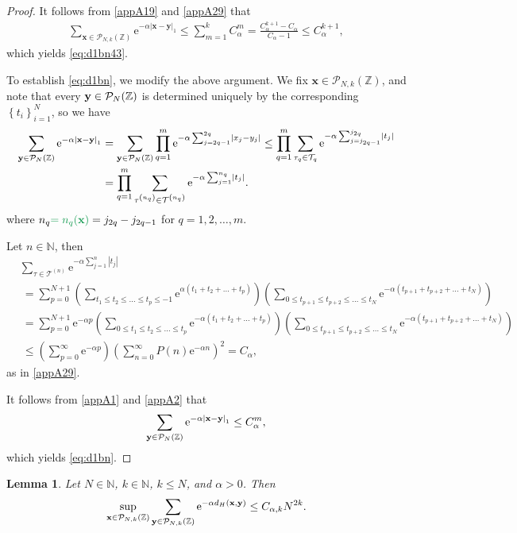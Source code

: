 \documentclass[12pt, a4paper,reqno]{amsart}
\newcommand{\fg}{\color{ForestGreen}}
\numberwithin{equation}{section}
\newtheorem{lemma}[theorem]{Lemma}
\newcommand\N{\mathbb N}
\newcommand\Z{\mathbb Z}
\newcommand\cT{\mathcal{T}}
\newcommand\x{\mathbf{x}}
\newcommand\y{\mathbf{y}}
\newcommand\e{\mathrm{e}}
\newcommand\cP{\mathcal{P}}
\newcommand\be{\begin{equation}\begin{aligned}}
\newcommand\ee{\end{aligned}\end{equation}}
\newcommand{\abs}[1]{\left\lvert #1 \right\rvert}
\newcommand{\set}[1]{\left\{ #1 \right\}}
\newcommand{\pa}[1]{\left( #1 \right)}
\newcommand{\eq}[1]{\eqref{#1}}
\newcommand{\up}[1]{^{\left(#1\right)}}
\begin{document}
\begin{proof}
It follows from \eq{appA19} and \eq{appA29} that 
\be
\sum_{{\x}\in\cP_{N,k}(\Z)} \e^{-\alpha \abs{\x-\y}_1} \le \sum_{m=1}^k  C_\alpha^m=  \tfrac {C_\alpha^{k+1}-C_\alpha}{C_\alpha-1}\le C_\alpha^{k+1},
\ee 
which yields \eq{eq:d1bn43}.  

 


To establish \eqref{eq:d1bn}, we  modify  the above argument. We fix  $\x \in \cP_{N,k}(\Z)$, and note that every 
 ${\bf y} \in   \cP_{N}(\Z)$ is determined uniquely by the corresponding $\set{t_i}_{i=1}^N$, so we have 
\be\label{appA1}
\sum_{{\bf y}\in\cP_{N}(\Z)} \e^{-\alpha \abs{\x-\y}_1}&=\sum_{{\bf y}\in\cP_{N}(\Z)} \prod_{q=1}^m
\e^{-\alpha \sum_{j=2q-1}^{2q} \abs{x_j-y_j}} \le  \prod_{q=1}^m \sum_{\tau_q \in \cT_q}
\e^{-\alpha \sum_{j=j_{2q-1}}^{j_{2q}} \abs{t_{j}}}\\ &
=  \prod_{q=1}^m \sum_{\tau\up{n_q} \in \cT\up{n_q}}
\e^{-\alpha \sum_{j=1}^{n_q} \abs{t_{j}}} .
\ee
 where  
 $n_q{\fg =n_q(\x)}= j_{2q}- j_{2q-1}$ for $q=1,2,\ldots,m$. 
 
 
Let $n\in \N$, then
 \be\label{appA2}
&\sum_{\tau \in \cT\up{n}}
\e^{-\alpha \sum_{j=1}^{n} \abs{t_{j}}}\\
& \  = \sum_{p=0}^{N+1}\pa{\sum_{t_1\le t_2\le \ldots \le t_p\le -1} \e^{\alpha (t_1 +t_2+\ldots +t_p)}}\pa{\sum_{0\le t_{p+1}\le t_{p+2}\le \ldots \le t_{N}} \e^{-\alpha (t_{p+1}+ t_{p+2}+\ldots +t_{N})}}\\
& \ = \sum_{p=0}^{N+1} \e^{-\alpha  p}\pa{\sum_{0\le t_1\le t_2\le \ldots \le t_p} \e^{-\alpha (t_1 +t_2+\ldots +t_p)}}\pa{\sum_{0\le t_{p+1}\le t_{p+2}\le \ldots \le t_{N}} \e^{-\alpha (t_{p+1}+ t_{p+2}+\ldots +t_{N})}}\\
&  \ \le  \pa{ \sum_{p=0}^{\infty} \e^{-\alpha  p}}  \pa{  \sum_{n=0}^\infty  P(n)    \e^{-\alpha  n} }^2
=  C_\alpha,
\ee
 as in \eq{appA29}.


It follows from \eq{appA1} and \eq{appA2} that 
\be
\sum_{{\bf y}\in\cP_{N}(\Z)} \e^{-\alpha \abs{\x-\y}_1} \le C_\alpha^m,
\ee 
which yields \eq{eq:d1bn}.
\end{proof}





\begin{lemma}\label{lem:expsum2}
Let  $N\in \N$,  $k\in \N$, $k\le N$, and  $\alpha>0$.  Then
\be\label{eq:dhbn}
 \sup_{\x\in \cP_{N,k}(\Z)} \sum_{{\bf y}\in\cP_{N,k}(\Z)} \e^{-\alpha d_H({\bf x},{\bf y})}\le C_{\alpha,k} N^{2k}.
\ee
\end{lemma}
\end{document}
